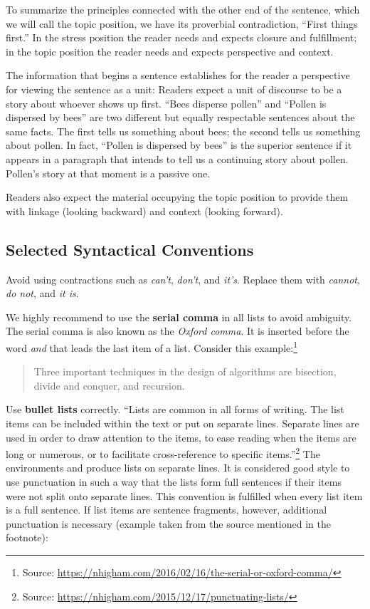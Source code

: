 To summarize the principles connected with the other end of the sentence, which we will call the topic position, we have its proverbial contradiction, “First things first.”
In the stress position the reader needs and expects closure and fulfillment; in the topic position the reader needs and expects perspective and context.

The information that begins a sentence establishes for the reader a perspective for viewing the sentence as a unit: Readers expect a unit of discourse to be a story about whoever shows up first. “Bees disperse pollen” and “Pollen is dispersed by bees” are two different but equally respectable sentences about the same facts. The first tells us something about bees; the second tells us something about pollen. In fact, “Pollen is dispersed by bees” is the superior sentence if it appears in a paragraph that intends to tell us a continuing story about pollen. Pollen’s story at that moment is a passive one.

Readers also expect the material occupying the topic position to provide them with linkage (looking backward) and context (looking forward).

\subsection{Selected Syntactical Conventions}

Avoid using contractions such as \emph{can't}, \emph{don't}, and \emph{it's}. Replace them with \emph{cannot}, \emph{do not}, and \emph{it is}.

We highly recommend to use the \textbf{serial comma} in all lists to avoid ambiguity. The serial comma is also known as the \emph{Oxford comma}. It is inserted before the word \emph{and} that leads the last item of a list. Consider this example:\footnote{Source: \url{https://nhigham.com/2016/02/16/the-serial-or-oxford-comma/}}
\begin{quote}
  Three important techniques in the design of algorithms are bisection, divide and conquer, and recursion.
\end{quote}

Use \textbf{bullet lists} correctly. ``Lists are common in all forms of writing. The list items can be included within the text or put on separate lines. Separate lines are used in order to draw attention to the items, to ease reading when the items are long or numerous, or to facilitate cross-reference to specific items.''\footnote{Source: \url{https://nhigham.com/2015/12/17/punctuating-lists/}} The environments  and  produce lists on separate lines. It is considered good style to use punctuation in such a way that the lists form full sentences if their items were not split onto separate lines. This convention is fulfilled when every list item is a full sentence. If list items are sentence fragments, however, additional punctuation is necessary (example taken from the source mentioned in the footnote):

